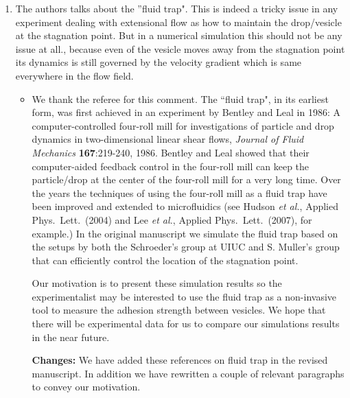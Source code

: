 \documentclass[11pt]{article}
\newcommand{\comment}[1]{{\color{blue} #1}}
\begin{document}
\begin{enumerate}
\noindent
\item\comment{The authors talks about the ''fluid trap". This is indeed
  a tricky issue in any experiment dealing with extensional flow as how
  to maintain the drop/vesicle at the stagnation point. But in a
  numerical simulation this should not be any issue at all., because
  even of the vesicle moves away from the stagnation point its dynamics
  is still governed by the velocity gradient which is same everywhere in
  the flow field.}
\begin{itemize}
  \item We thank the referee for this comment. The ``fluid trap", in its
    earliest form, was first achieved in an experiment by Bentley and
    Leal in 1986: A computer-controlled four-roll mill for
    investigations of particle and drop dynamics in two-dimensional
    linear shear flows, {\em Journal of Fluid Mechanics} {\bf
    167}:219-240, 1986.  Bentley and Leal showed that their
    computer-aided feedback control in the four-roll mill can keep the
    particle/drop at the center of the four-roll mill for a very long
    time.  Over the years the techniques of using the four-roll mill as
    a fluid trap have been improved and extended to microfluidics (see
    Hudson {\em et al.}, Applied Phys.~Lett.~(2004) and Lee {\em et
    al.}, Applied Phys.~Lett.~(2007), for example.) In the original
    manuscript we simulate the fluid trap based on the setups by both
    the Schroeder's group at UIUC and S. Muller's group that can
    efficiently control the location of the stagnation point. 
  
    Our motivation is to present these simulation results so the
    experimentalist may be interested to use the fluid trap as a
    non-invasive tool to measure the adhesion strength between vesicles.
    We hope that there will be experimental data for us to compare our
    simulations results in the near future.
  
   \noindent
  {\bf Changes:} We have added these references on fluid trap in the
    revised manuscript. In addition we have rewritten a couple of
    relevant paragraphs to convey our motivation.
 \end{itemize}



\end{enumerate}
\end{document}
